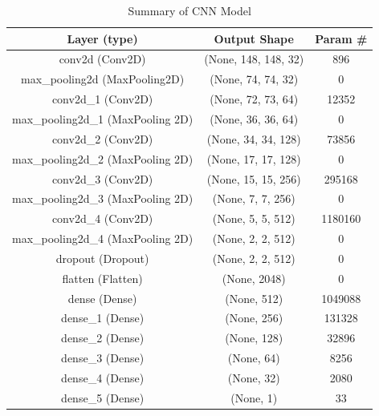 \documentclass[conference]{IEEEtran}
\begin{document}
\begin{table}[htbp]
\caption{Summary of CNN Model}
\label{tab:summary}
\begin{tabular}{|c|c|c|}
\hline
\textbf{Layer (type)}             & \textbf{Output Shape} & \textbf{Param \#} \\ \hline
conv2d (Conv2D)                   & (None, 148, 148, 32)  & 896               \\ \hline
max\_pooling2d (MaxPooling2D)     & (None, 74, 74, 32)    & 0                 \\ \hline
conv2d\_1 (Conv2D)                & (None, 72, 73, 64)    & 12352             \\ \hline
max\_pooling2d\_1 (MaxPooling 2D) & (None, 36, 36, 64)    & 0                 \\ \hline
conv2d\_2 (Conv2D)                & (None, 34, 34, 128)   & 73856             \\ \hline
max\_pooling2d\_2 (MaxPooling 2D) & (None, 17, 17, 128)   & 0                 \\ \hline
conv2d\_3 (Conv2D)                & (None, 15, 15, 256)   & 295168            \\ \hline
max\_pooling2d\_3 (MaxPooling 2D) & (None, 7, 7, 256)     & 0                 \\ \hline
conv2d\_4 (Conv2D)                & (None, 5, 5, 512)     & 1180160           \\ \hline
max\_pooling2d\_4 (MaxPooling 2D) & (None, 2, 2, 512)     & 0                 \\ \hline
dropout (Dropout)                 & (None, 2, 2, 512)     & 0                 \\ \hline
flatten (Flatten)                 & (None, 2048)          & 0                 \\ \hline
dense (Dense)                     & (None, 512)           & 1049088           \\ \hline
dense\_1 (Dense)                  & (None, 256)           & 131328            \\ \hline
dense\_2 (Dense)                  & (None, 128)           & 32896             \\ \hline
dense\_3 (Dense)                  & (None, 64)            & 8256              \\ \hline
dense\_4 (Dense)                  & (None, 32)            & 2080              \\ \hline
dense\_5 (Dense)                  & (None, 1)             & 33                \\ \hline
\end{tabular}
\end{table}
\end{document}

